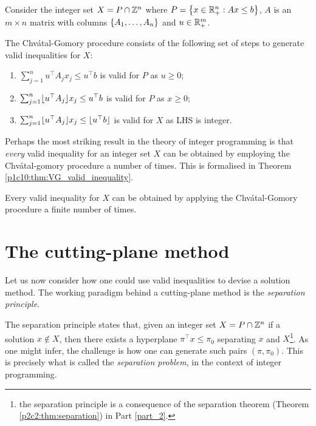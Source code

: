 \begin{definition} \label{p1c10:def:CG-procedure}
	Consider the integer set $X = P \cap \mathbb{Z}^n$ where \lb $P = \left\{ x \in \mathbb{R}^n_+ : Ax \leq b \right \}$, $A$ is an $m \times n$ matrix with columns $\left\{ A_1, \dots, A_n \right \}$ and $u \in \mathbb{R}^m_+$.
	
	The Chv\'atal-Gomory procedure consists of the following set of steps to generate valid inequalities for $X$:
	\begin{enumerate}
	    \item $\sum_{j=1}^n u^\top A_jx_j \leq u^\top b$ is valid for $P$ as $u\geq 0$;
	    \item $\sum_{j=1}^n \lfloor u^\top A_j \rfloor x_j \leq u^\top b$ is valid for $P$ as $x \geq 0$;
	    \item $\sum_{j=1}^n  \lfloor u^\top A_j \rfloor x_j \leq \lfloor u^\top b \rfloor$ is valid for $X$ as LHS is integer.
	\end{enumerate}		
\end{definition}
	
Perhaps the most striking result in the theory of integer programming is that \emph{every} valid inequality for an integer set $X$ can be obtained by employing the Chv\'atal-gomory procedure a number of times. This is formalised in Theorem \ref{p1c10:thm:VG_valid_inequality}.

\begin{theorem} \label{p1c10:thm:VG_valid_inequality}
	Every valid inequality for $X$ can be obtained by applying the Chv\'atal-Gomory procedure a finite number of times.
\end{theorem}
	
	
	
\section{The cutting-plane method}

Let us now consider how one could use valid inequalities to devise a solution method. The working paradigm behind a cutting-plane method is the \emph{separation principle}. 

The separation principle states that, given an integer set $X = P \cap \mathbb{Z}^n$ if a solution $x \notin X$, then there exists a hyperplane $\pi^\top x \leq \pi_0$ separating $x$ and $X$\footnote{the separation principle is a consequence of the separation theorem (Theorem \ref{p2c2:thm:separation}) in Part \ref{part_2}.}. As one might infer, the challenge is how one can generate such pairs $(\pi, \pi_0)$. This is precisely what is called the \emph{separation problem}, in the context of integer programming.

